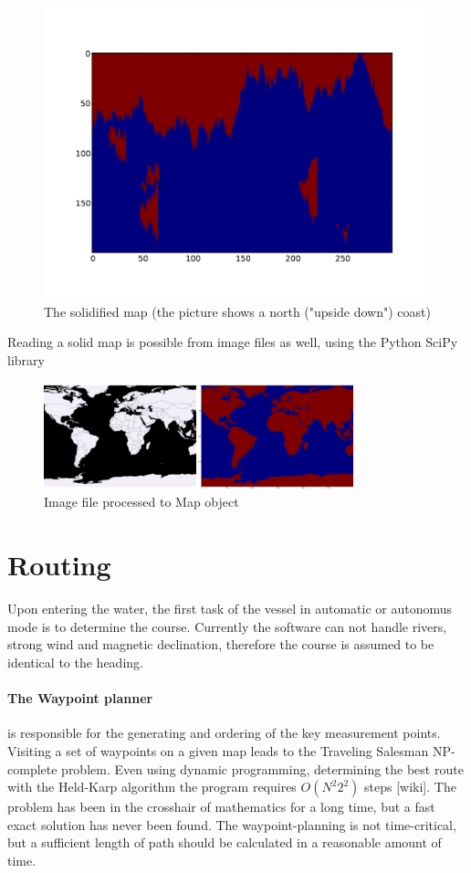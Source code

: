 \begin{figure}[H]
	\centering
	\includegraphics[width=\textwidth]{img/solidmap}
	\caption{The solidified map (the picture shows a north ("upside down") coast)}
	\label{fig:solidmap}
\end{figure}

Reading a solid map is possible from image files as well, using the Python SciPy library

\begin{figure}[H]
	\centering
	\includegraphics[width=0.8\textwidth]{img/worldmap}
	\caption{Image file processed to Map object}
	\label{fig:worldmap}
\end{figure}

\section{Routing}

Upon entering the water, the first task of the vessel in automatic or autonomus mode is to determine the course. Currently the software can not handle rivers, strong wind and magnetic declination, therefore the course is assumed to be identical to the heading.

\paragraph{The Waypoint planner} is responsible for the generating and ordering of the key measurement points. Visiting a set of waypoints on a given map leads to the Traveling Salesman NP-complete problem. Even using dynamic programming, determining the best route with the Held-Karp algorithm the program requires $O(N^2 2^2)$ steps [wiki]. The problem has been in the crosshair of mathematics for a long time, but a fast exact solution has never been found. The waypoint-planning is not time-critical, but a sufficient length of path should be calculated in a reasonable amount of time.

